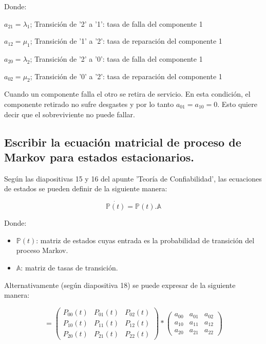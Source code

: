 \documentclass[
    11pt,
    spanish,
    a4paper
]{article}
\begin{document}
Donde:

$ a_{21} = \lambda_1 $; Transición de '2' a '1': tasa de falla del componente 1

$ a_{12} = \mu_1 $; Transición de '1' a '2': tasa de reparación del componente 1

$ a_{20} = \lambda_2$; Transición de '2' a '0': tasa de falla del componente 1

$ a_{02} = \mu_2$; Transición de '0' a '2': tasa de reparación del componente 1

Cuando un componente falla el otro se retira de servicio.
En esta condición, el componente retirado no sufre desgastes y por lo tanto $ a_{01} = a_{10} = 0 $.
Esto quiere decir que el sobreviviente no puede fallar.

\subsection{Escribir la ecuación matricial de proceso de Markov para estados estacionarios.}

Según las diapositivas 15 y 16 del apunte 'Teoría de Confiabilidad', las ecuaciones de estados se pueden definir de la siguiente manera:

$$ \dot{\mathbb{P}(t)} = \mathbb{P}(t) . \mathbb{A} $$

Donde:
\begin{itemize}
	\item $ \mathbb{P}(t) $: matriz de estados cuyas entrada es la probabilidad de transición del proceso Markov.
	\item $ \mathbb{A} $: matriz de tasas de transición.
\end{itemize}

Alternativamente (según diapositiva 18) se puede expresar de la siguiente manera:

\begin{equation}
	[\dot{P_0(t)},\dot{P_1(t)},\dot{P_2(t)}] =
	\begin{pmatrix}
		P_{00}(t) & P_{01}(t) & P_{02}(t) \\
		P_{10}(t) & P_{11}(t) & P_{12}(t) \\
		P_{20}(t) & P_{21}(t) & P_{22}(t)
	\end{pmatrix} *
	\begin{pmatrix}
		a_{00} & a_{01} & a_{02} \\
		a_{10} & a_{11} & a_{12} \\
		a_{20} & a_{21} & a_{22}
	\end{pmatrix}
\end{equation}
\end{document}
